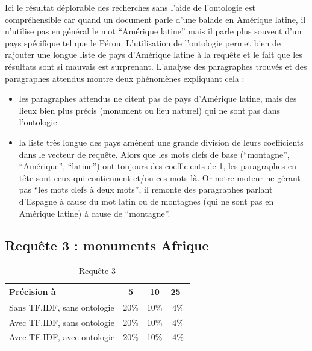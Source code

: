 \documentclass{article}
\begin{document}
Ici le résultat déplorable des recherches sans l’aide de l’ontologie est
compréhensible car quand un document parle d’une balade en Amérique latine, il
n’utilise pas en général le mot “Amérique latine” mais il parle plus souvent d’un
pays spécifique tel que le Pérou. L’utilisation de l’ontologie permet bien de
rajouter une longue liste de pays d’Amérique latine à la requête et le fait que les
résultats sont si mauvais est surprenant. L'analyse des paragraphes trouvés et des
paragraphes attendus montre deux phénomènes expliquant cela :

\begin{itemize}

    \item les paragraphes attendus ne citent pas de pays d’Amérique latine, mais des
        lieux bien plus précis (monument ou lieu naturel) qui ne sont pas dans
        l’ontologie

    \item la liste très longue des pays amènent une grande division de leurs
        coefficients dans le vecteur de requête. Alors que les mots clefs de base
        (“montagne”, “Amérique”, “latine”) ont toujours des coefficients de 1, les
        paragraphes en tête sont ceux qui contiennent et/ou ces mots-là. Or notre
        moteur ne gérant pas “les mots clefs à deux mots”, il remonte des paragraphes
        parlant d’Espagne à cause du mot latin ou de montagnes (qui ne sont pas en
        Amérique latine) à cause de “montagne”.

\end{itemize}

\subsection{Requête 3 : \og monuments Afrique \fg }

\begin{table}[H]
    \centering
    \caption{Requête 3}
\begin{tabular}{|l|c|c|c|}
    \hline
    Précision à & 5 & 10 & 25 \\
    \hline
    Sans TF.IDF, sans ontologie & 20\% & 10\% & 4\% \\
    \hline
    Avec TF.IDF, sans ontologie & 20\% & 10\% & 4\% \\
    \hline
    Avec TF.IDF, avec ontologie & 20\% & 10\% & 4\% \\
    \hline
\end{tabular}
\end{table}
\end{document}
